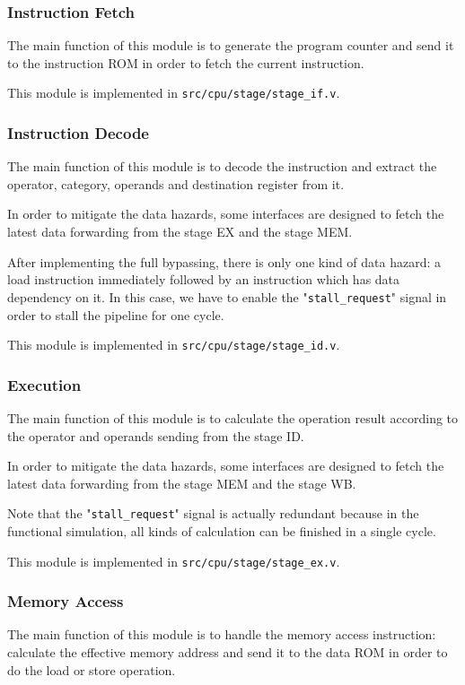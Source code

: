 \documentclass{article}
\begin{document}
\subsubsection{Instruction Fetch}
The main function of this module is to generate the program counter and send it to the instruction ROM in order to fetch the current instruction.


This module is implemented in \texttt{src/cpu/stage/stage\_if.v}.

\subsubsection{Instruction Decode}
The main function of this module is to decode the instruction and extract the operator, category, operands and destination register from it.


In order to mitigate the data hazards, some interfaces are designed to fetch the latest data forwarding from the stage EX and the stage MEM.

After implementing the full bypassing, there is only one kind of data hazard: a load instruction immediately followed by an instruction which has data dependency on it. In this case, we have to enable the "\texttt{stall\_request}" signal in order to stall the pipeline for one cycle.

This module is implemented in \texttt{src/cpu/stage/stage\_id.v}.

\newpage
\subsubsection{Execution}
The main function of this module is to calculate the operation result according to the operator and operands sending from the stage ID.


In order to mitigate the data hazards, some interfaces are designed to fetch the latest data forwarding from the stage MEM and the stage WB.

Note that the "\texttt{stall\_request}" signal is actually redundant because in the functional simulation, all kinds of calculation can be finished in a single cycle.

This module is implemented in \texttt{src/cpu/stage/stage\_ex.v}.

\newpage
\subsubsection{Memory Access}
The main function of this module is to handle the memory access instruction: calculate the effective memory address and send it to the data ROM in order to do the load or store operation.

\end{document}
